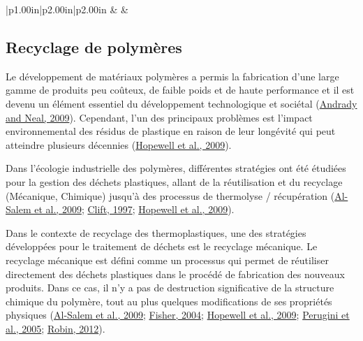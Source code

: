 \documentclass[
]{article}
\begin{document}
\begin{longtable}[c]{|p{1.00in}|p{2.00in}|p{2.00in}}
 &  &  \\



\end{longtable}

\hypertarget{recyclage-de-polymuxe8res}{%
\subsection{Recyclage de polymères}\label{recyclage-de-polymuxe8res}}

Le développement de matériaux polymères a permis la fabrication d'une
large gamme de produits peu coûteux, de faible poids et de haute
performance et il est devenu un élément essentiel du développement
technologique et sociétal (\protect\hyperlink{ref-Andrady2009}{Andrady
and Neal, 2009}). Cependant, l'un des principaux problèmes est l'impact
environnemental des résidus de plastique en raison de leur longévité qui
peut atteindre plusieurs décennies
(\protect\hyperlink{ref-Hopewell2009}{Hopewell et al., 2009}).

Dans l'écologie industrielle des polymères, différentes stratégies ont
été étudiées pour la gestion des déchets plastiques, allant de la
réutilisation et du recyclage (Mécanique, Chimique) jusqu'à des
processus de thermolyse / récupération
(\protect\hyperlink{ref-AlSalem2009}{Al-Salem et al., 2009};
\protect\hyperlink{ref-Clift1997}{Clift, 1997};
\protect\hyperlink{ref-Hopewell2009}{Hopewell et al., 2009}).

Dans le contexte de recyclage des thermoplastiques, une des stratégies
développées pour le traitement de déchets est le recyclage mécanique. Le
recyclage mécanique est défini comme un processus qui permet de
réutiliser directement des déchets plastiques dans le procédé de
fabrication des nouveaux produits. Dans ce cas, il n'y a pas de
destruction significative de la structure chimique du polymère, tout au
plus quelques modifications de ses propriétés physiques
(\protect\hyperlink{ref-AlSalem2009}{Al-Salem et al., 2009};
\protect\hyperlink{ref-Fisher2004}{Fisher, 2004};
\protect\hyperlink{ref-Hopewell2009}{Hopewell et al., 2009};
\protect\hyperlink{ref-Perugini2005}{Perugini et al., 2005};
\protect\hyperlink{ref-Robin2012}{Robin, 2012}).
\end{document}
